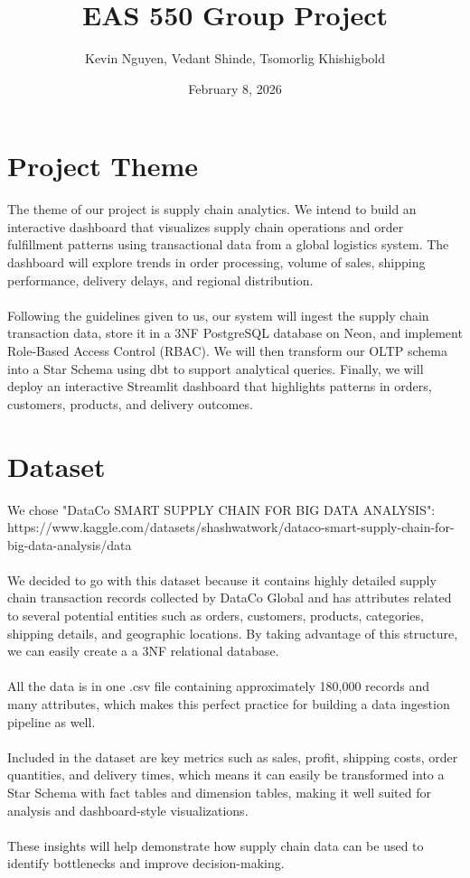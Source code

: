 \documentclass{article}
\title{EAS 550 Group Project}
\author{Kevin Nguyen, Vedant Shinde, Tsomorlig Khishigbold}
\date{February 8, 2026}
\begin{document}
\maketitle

\section*{Project Theme}
The theme of our project is supply chain analytics. We intend to build an interactive dashboard that visualizes supply chain operations and order fulfillment patterns using transactional data from a global logistics system. The dashboard will explore trends in order processing, volume of sales, shipping performance, delivery delays, and regional distribution.\\
\\
Following the guidelines given to us, our system will ingest the supply chain transaction data, store it in a 3NF PostgreSQL database on Neon, and implement Role-Based Access Control (RBAC). We will then transform our OLTP schema into a Star Schema using dbt to support analytical queries. Finally, we will deploy an interactive Streamlit dashboard that highlights patterns in orders, customers, products, and delivery outcomes.

\section*{Dataset}
We chose "DataCo SMART SUPPLY CHAIN FOR BIG DATA ANALYSIS":\\
https://www.kaggle.com/datasets/shashwatwork/dataco-smart-supply-chain-for-big-data-analysis/data\\
\\
We decided to go with this dataset because it contains highly detailed supply chain transaction records collected by DataCo Global and has attributes related to several potential entities such as orders, customers, products, categories, shipping details, and geographic locations. By taking advantage of this structure, we can easily create a a 3NF relational database.\\
\\
All the data is in one .csv file containing approximately 180,000 records and many attributes, which makes this perfect practice for building a data ingestion pipeline as well.\\
\\
Included in the dataset are key metrics such as sales, profit, shipping costs, order quantities, and delivery times, which means it can easily be transformed into a Star Schema with fact tables and dimension tables, making it well suited for analysis and dashboard-style visualizations.\\
\\
These insights will help demonstrate how supply chain data can be used to identify bottlenecks and improve decision-making.
\end{document}
